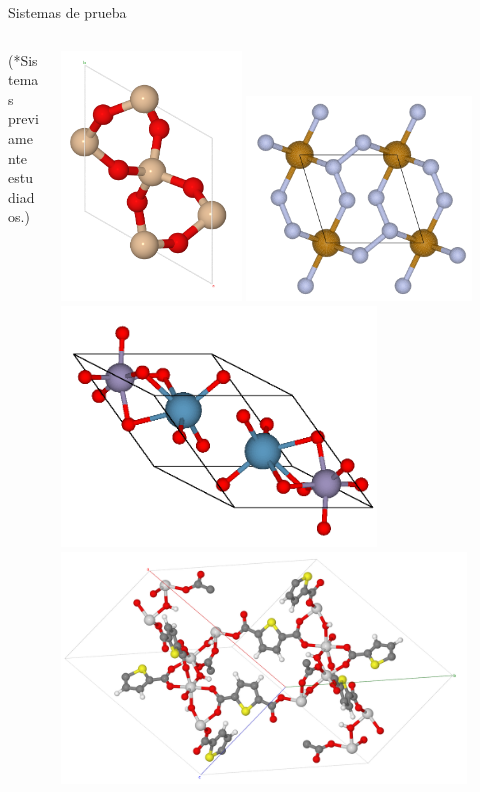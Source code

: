 \documentclass[dvisvgm,11pt,aspectratio=169]{beamer}
\begin{document}
\begin{frame}{Sistemas de prueba}
\begin{columns}
\begin{column}{0.7\textwidth}
	(*Sistemas previamente estudiados.)
\end{column}
\begin{column}{0.3\textwidth}
\centering
\includegraphics[width=0.4\textwidth]{img/quartz}
\includegraphics[width=0.5\textwidth]{img/FeN4}
\includegraphics[width=0.7\textwidth]{img/ilmenite}
\includegraphics[width=0.9\textwidth]{img/nott401}

\end{column}
\end{columns}

\end{frame}
\end{document}
